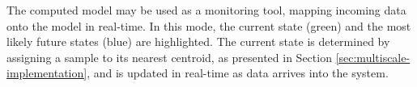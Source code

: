 


The computed model may be used as a monitoring tool, mapping incoming data onto the model in real-time. 
In this mode, the current state (green) and the most likely future states (blue)
are highlighted. The current state is determined by assigning a sample to its nearest 
centroid, as presented in Section \ref{sec:multiscale-implementation}, and is updated in real-time as
data arrives into the system.

